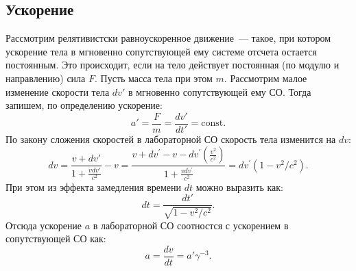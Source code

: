 \subsection{Ускорение}
Рассмотрим релятивистски равноускоренное движение~--- такое, при котором ускорение тела в мгновенно сопутствующей ему системе отсчета остается постоянным. Это происходит, если на тело действует постоянная (по модулю и направлению) сила $F$. Пусть масса тела при этом $m$. Рассмотрим малое изменение скорости тела $dv'$ в мгновенно сопутствующей ему СО. Тогда запишем, по определению ускорение:
\begin{equation*}
	a' = \frac{F}{m} = \frac{dv'}{dt'} = \text{const}.
\end{equation*}
По закону сложения скоростей в лабораторной СО скорость тела изменится на $dv$:
\begin{equation*}
	dv = \frac{v+dv'}{1+\frac{v dv'}{c^2}} - v = \frac{v+d v^{\prime}-v-d v^{\prime}\left(\frac{v^2}{c^2}\right)}{1+\frac{v d v^{\prime}}{c^2}}=d v^{\prime}\left(1-v^2 / c^2\right).
\end{equation*}
При этом из эффекта замедления времени $dt$ можно выразить как:
\begin{equation*}
	dt = \frac{dt'}{\sqrt{1-v^2/c^2}}.
\end{equation*}
Отсюда ускорение $a$ в лабораторной СО соотностся с ускорением в сопутствующей СО как:
\begin{equation}
	a = \frac{dv}{dt} = a' \gamma^{-3}.
\end{equation}